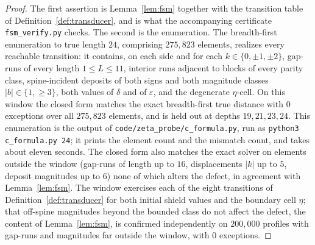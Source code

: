 \documentclass[11pt]{article}
\theoremstyle{plain}
\theoremstyle{definition}
\theoremstyle{remark}
\begin{document}
\begin{proof}
The first assertion is Lemma~\ref{lem:fsm} together with the transition table of
Definition~\ref{def:transducer}, and is what the accompanying certificate
\texttt{fsm\_verify.py} checks. The second is the enumeration. The breadth-first
enumeration to true length $24$, comprising $275{,}823$ elements, realizes
every reachable transition: it contains, on each side and for each
$k\in\{0,\pm1,\pm2\}$, gap-runs of every length $1\le L\le11$, interior runs
adjacent to blocks of every parity class, spine-incident deposits of both signs
and both magnitude classes $|b|\in\{1,\ge3\}$, both values of $\delta$ and of
$\varepsilon$, and the degenerate $\eta$-cell. On this window the closed form
matches the exact breadth-first true distance with $0$ exceptions over all
$275{,}823$ elements, and is held out at depths $19,21,23,24$. This
enumeration is the output of \texttt{code/zeta\_probe/c\_formula.py}, run as
\texttt{python3 c\_formula.py 24}; it prints the element count and the
mismatch count, and takes about eleven seconds. The closed form
also matches the exact solver on elements outside the window (gap-runs of
length up to $16$, displacements $|k|$ up to $5$, deposit magnitudes up to $6$) none of which alters the defect, in agreement with Lemma~\ref{lem:fsm}.
The window exercises each of the eight transitions of
Definition~\ref{def:transducer} for both initial shield values and the boundary
cell $\eta$; that off-spine magnitudes beyond the bounded class do not affect the
defect, the content of Lemma~\ref{lem:fsm}, is confirmed independently on
$200{,}000$ profiles with gap-runs and magnitudes far outside the window, with
$0$ exceptions.
\end{proof}
\end{document}
